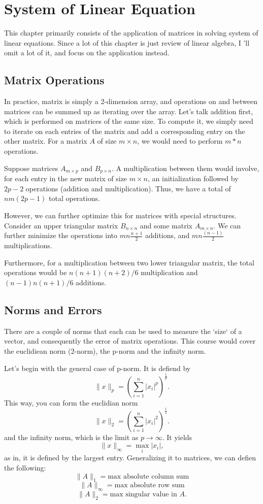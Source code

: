 \documentclass[5pt, a4paper]{article}
\begin{document}
\section{System of Linear Equation}
This chapter primarily consists of the application of matrices in solving system
of linear equations. Since a lot of this chapter is just review of linear
algebra, I 'll omit a lot of it, and focus on the application instead.
\subsection*{Matrix Operations}
In practice, matrix is simply a 2-dimension array, and operations on and between
matrices can be summed up as iterating over the array. Let's talk addition
first, which is performed on matrices of the same size. To compute it, we simply
need to iterate on each entries of the matrix and add a corresponding entry on
the other matrix. For a matrix $A$ of size $m \times n$, we would need to
perform $m*n$ operations.

Suppose matrices  $A_{m \times p}$ and $B_{p \times n}$. A multiplication
between them would involve, for each entry in the  new matrix of size $m \times
n$, an initialization followed by $2p - 2$ operations (addition and
multiplication). Thus, we have a total of $nm(2p-1)$ total operations.

However, we can further optimize this for matrices with special structures.
Consider an upper triangular matrix $B_{n \times n}$ and some matrix $A_{m
\times n}$. We can further minimize the operations into $mn\frac{n+1}{2}$
additions, and $mn\frac{\left(  n-1 \right) }{2}$ multiplications.

Furthermore, for a multiplication between two lower triangular matrix, the total
operations would be $n(n+1)(n+2)/6$ multiplication and $(n-1)n(n+1) / 6$
additions.

\subsection*{Norms and Errors}
There are a couple of norms that each can be used to measure the `size` of a
vector, and consequently the error of matrix operations. This course would cover
the euclidiean norm (2-norm), the p-norm and the infinity norm.

Let's begin with the general case of p-norm. It is defiend by  \[
\|x\|_p = \left(\sum_{i = 1}^{n} |x_{i}|^p  \right)^{\frac{1}{p}}
.\] 
This way, you can form the euclidian norm \[
\|x\|_2 = \left(\sum_{i = 1}^{n} |x_{i}|^2  \right)^{\frac{1}{2}}
.\] 
and the infinity norm, which is the limit as $p \to \infty$. It yields \[
    \|x\|_{\infty} = \max_i |x_i|
,\] 
as in, it is defined by the largest entry. Generalizing it to matrices, we can
defien the following:
\[
    \|A\|_1 = \text{max absolute column sum} 
\]
\[
    \|A\|_{\infty} = \text{max absolute row sum}
\]
\[
    \|A\|_{2} = \text{max singular value in $A$}
.\] 
\end{document}
